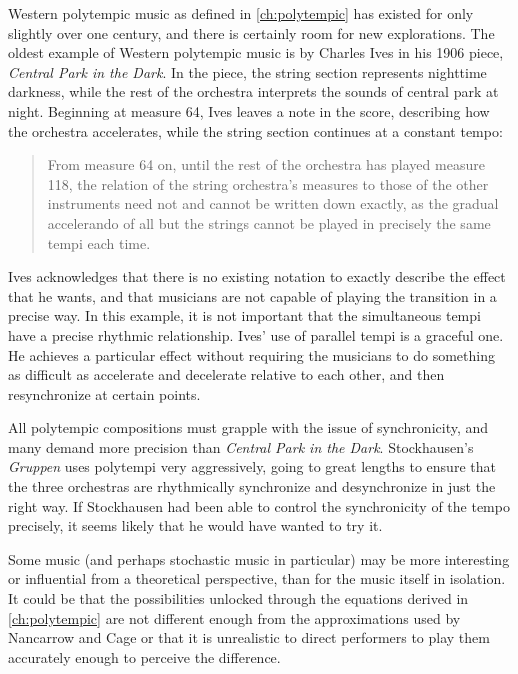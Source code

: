 Western polytempic music as defined in \autoref{ch:polytempic} has
existed for only slightly over one century, and there is certainly
room for new explorations. The oldest example of Western polytempic
music is by Charles Ives in his 1906 piece, \textit{Central Park in
  the Dark}.\cite{Greschak2003} In the piece, the string section
represents nighttime darkness, while the rest of the orchestra
interprets the sounds of central park at night. Beginning at measure
64, Ives leaves a note in the score, describing how the orchestra
accelerates, while the string section continues at a constant tempo:
\begin{quotation}
  From measure 64 on, until the rest of the orchestra has played
  measure 118, the relation of the string orchestra's measures to
  those of the other instruments need not and cannot be written down
  exactly, as the gradual accelerando of all but the strings cannot be
  played in precisely the same tempi each time.
\end{quotation}
Ives acknowledges that there is no existing notation to exactly
describe the effect that he wants, and that musicians are not capable
of playing the transition in a precise way. In this example, it is not
important that the simultaneous tempi have a precise rhythmic
relationship. Ives' use of parallel tempi is a graceful one. He
achieves a particular effect without requiring the musicians to do
something as difficult as accelerate and decelerate relative to each
other, and then resynchronize at certain points.

All polytempic compositions must grapple with the issue of
synchronicity, and many demand more precision than \textit{Central Park in
  the Dark}. Stockhausen's \textit{Gruppen} uses polytempi very
aggressively, going to great lengths to ensure that the three
orchestras are rhythmically synchronize and desynchronize in just the
right way.  If Stockhausen had been able to control the synchronicity
of the tempo precisely, it seems likely that he would have wanted
to try it.

Some music (and perhaps stochastic music in particular) may be more
interesting or influential from a theoretical perspective, than for
the music itself in isolation. It could be that the possibilities
unlocked through the equations derived in \autoref{ch:polytempic} are
not different enough from the approximations used by Nancarrow and
Cage or that it is unrealistic to direct performers to play them
accurately enough to perceive the difference.

